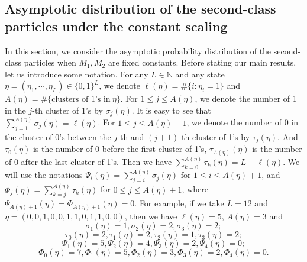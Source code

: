 \documentclass[12pt,a4paper]{amsart}
\theoremstyle{remark}
\numberwithin{equation}{section} \numberwithin{theorem}{section}
\begin{document}
\subsection{Asymptotic distribution of the second-class particles under the constant scaling}
\label{ssec:constant-scaling}
In this section, we consider the asymptotic probability distribution of the second-class particles when $M_1,M_2$ are fixed constants. Before stating our main results, let us introduce some notation. For any $L\in\mathbb{N}$ and any state $\eta=(\eta_1,\cdots,\eta_L) \in \{0,1\}^{L}$, we denote $\ell(\eta)=\#\{i: \eta_i=1\}$ and $A(\eta)=\#\{\text{clusters of 1's in}\ \eta \}$. For $1 \leq j \leq A(\eta)$, we denote the number of 1 in the $j$-th cluster of 1's by $\sigma_j(\eta)$. It is easy to see that $\sum_{j=1}^{A(\eta)}\sigma_{j}(\eta)=\ell(\eta)$. For $1 \leq j \leq A(\eta)-1$, we denote the number of 0 in the cluster of 0's between the $j$-th and $(j+1)$-th cluster of 1's by $\tau_j(\eta)$. And $\tau_0(\eta)$ is the number of 0 before the first cluster of 1's, $\tau_{A(\eta)}(\eta)$ is the number of 0 after the last cluster of 1's. Then we have $\sum_{k=0}^{A(\eta)}\tau_{k}(\eta)=L-\ell(\eta)$. We will use the notations $\Psi_i(\eta)=\sum_{j=i}^{A(\eta)}\sigma_{j}(\eta)$ for $1 \leq i \leq A(\eta)+1$, and $\Phi_j(\eta)= \sum_{k=j}^{A(\eta)}\tau_{k}(\eta)$ for $0 \leq j \leq A(\eta)+1$, where $\Psi_{A(\eta)+1}(\eta)=\Phi_{A(\eta)+1}(\eta)=0$. For example, if we take $L=12$ and $\eta=(0,0,1,0,0,1,1,0,1,1,0,0)$, then we have $\ell(\eta)=5$, $A(\eta)=3$ and 
\[\sigma_1(\eta)=1, \sigma_2(\eta)=2, \sigma_3(\eta)=2;\]
\[\tau_0(\eta)=2,\tau_1(\eta)=2, \tau_2(\eta)=1,\tau_3(\eta)=2;\]
\[\Psi_1(\eta)=5, \Psi_2(\eta)=4, \Psi_3(\eta)=2, \Psi_4(\eta)=0;\]
\[\Phi_0(\eta)=7, \Phi_1(\eta)=5,\Phi_2(\eta)=3,\Phi_3(\eta)=2,\Phi_4(\eta)=0.\]
\end{document}

